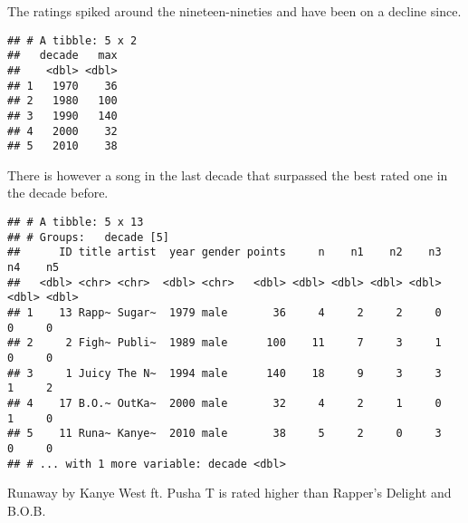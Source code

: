 \documentclass[
]{article}
\newenvironment{Shaded}{\begin{snugshade}}{\end{snugshade}}
\newcommand{\DataTypeTok}[1]{\textcolor[rgb]{0.13,0.29,0.53}{#1}}
\newcommand{\DecValTok}[1]{\textcolor[rgb]{0.00,0.00,0.81}{#1}}
\newcommand{\KeywordTok}[1]{\textcolor[rgb]{0.13,0.29,0.53}{\textbf{#1}}}
\newcommand{\NormalTok}[1]{#1}
\newcommand{\OperatorTok}[1]{\textcolor[rgb]{0.81,0.36,0.00}{\textbf{#1}}}
\newcommand{\StringTok}[1]{\textcolor[rgb]{0.31,0.60,0.02}{#1}}
\begin{document}
The ratings spiked around the nineteen-nineties and have been on a
decline since.

\begin{Shaded}
\end{Shaded}

\begin{verbatim}
## # A tibble: 5 x 2
##   decade   max
##    <dbl> <dbl>
## 1   1970    36
## 2   1980   100
## 3   1990   140
## 4   2000    32
## 5   2010    38
\end{verbatim}

There is however a song in the last decade that surpassed the best rated
one in the decade before.

\begin{Shaded}
\end{Shaded}

\begin{verbatim}
## # A tibble: 5 x 13
## # Groups:   decade [5]
##      ID title artist  year gender points     n    n1    n2    n3    n4    n5
##   <dbl> <chr> <chr>  <dbl> <chr>   <dbl> <dbl> <dbl> <dbl> <dbl> <dbl> <dbl>
## 1    13 Rapp~ Sugar~  1979 male       36     4     2     2     0     0     0
## 2     2 Figh~ Publi~  1989 male      100    11     7     3     1     0     0
## 3     1 Juicy The N~  1994 male      140    18     9     3     3     1     2
## 4    17 B.O.~ OutKa~  2000 male       32     4     2     1     0     1     0
## 5    11 Runa~ Kanye~  2010 male       38     5     2     0     3     0     0
## # ... with 1 more variable: decade <dbl>
\end{verbatim}

Runaway by Kanye West ft. Pusha T is rated higher than Rapper's Delight
and B.O.B.
\end{document}
